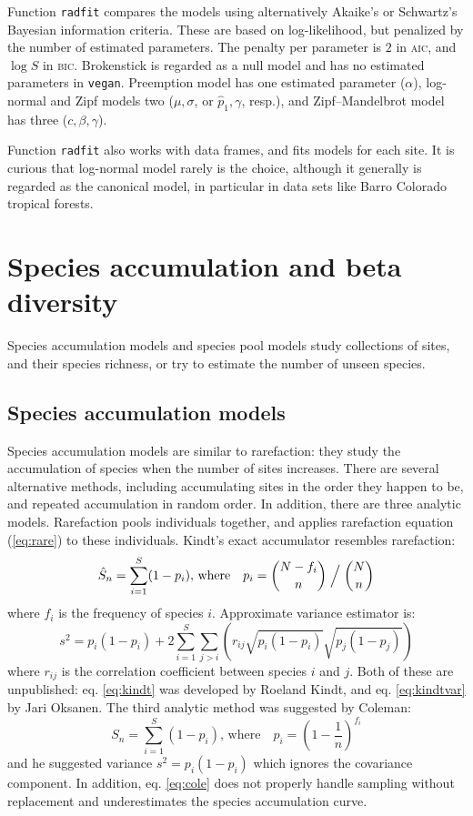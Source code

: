 \documentclass[a4paper,10pt]{amsart}
\begin{document}
Function \texttt{radfit} compares the models using alternatively
Akaike's or Schwartz's Bayesian information criteria.  These are based
on log-likelihood, but penalized by the number of estimated
parameters.  The penalty per parameter is $2$ in \textsc{aic}, and
$\log S$ in \textsc{bic}.  Brokenstick is regarded as a null model and
has no estimated parameters in \texttt{vegan}.  Preemption model has
one estimated parameter ($\alpha$), log-normal and Zipf models two
($\mu, \sigma$, or $\hat p_1, \gamma$, resp.), and Zipf--Mandelbrot
model has three ($c, \beta, \gamma$).

Function \texttt{radfit} also works with data frames, and fits models
for each site. It is curious that log-normal model rarely is the
choice, although it generally is regarded as the canonical model, in
particular in data sets like Barro Colorado tropical forests.

\section{Species accumulation and beta diversity}

Species accumulation models and species pool models study collections
of sites, and their species richness, or try to estimate the number of
unseen species.

\subsection{Species accumulation models}

Species accumulation models are similar to rarefaction: they study the
accumulation of species when the number of sites increases.  There are
several alternative methods, including accumulating sites in the order
they happen to be, and repeated accumulation in random order.  In
addition, there are three analytic models.  Rarefaction pools
individuals together, and applies rarefaction equation (\ref{eq:rare})
to these individuals.  Kindt's exact accumulator resembles rarefaction:
\begin{equation}
\label{eq:kindt}
\hat S_n = \sum_{i=1}^S (1 - p_i), \, \text{where} \quad p_i = {N- f_i
\choose n} \Bigm / {N \choose n}
\end{equation}
where $f_i$ is the frequency of species $i$.  Approximate variance
estimator is:
\begin{equation}
\label{eq:kindtvar}
s^2 = p_i (1 - p_i) + 2 \sum_{i=1}^S \sum_{j>i} \left( r_{ij}
  \sqrt{p_i(1-p_i)} \sqrt{p_j (1-p_j)}\right)
\end{equation}
where $r_{ij}$ is the correlation coefficient between species $i$ and
$j$.  Both of these are unpublished: eq. \ref{eq:kindt} was developed
by Roeland Kindt, and eq. \ref{eq:kindtvar} by Jari Oksanen. The third
analytic method was suggested by Coleman:
\begin{equation}
\label{eq:cole}
S_n = \sum_{i=1}^S (1 - p_i), \, \text{where} \quad p_i = \left(1 - \frac{1}{n}\right)^{f_i}
\end{equation}
and he suggested variance $s^2 = p_i (1-p_i)$ which ignores the
covariance component.  In addition, eq. \ref{eq:cole} does not
properly handle sampling without replacement and underestimates the
species accumulation curve.
\end{document}
